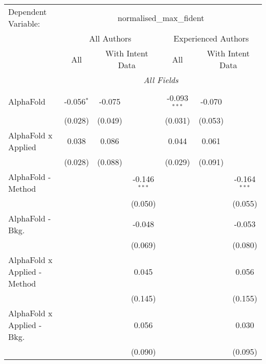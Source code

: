\begingroup
\centering
\begin{tabular}{lcccccc}
   \tabularnewline \midrule \midrule
   Dependent Variable: & \multicolumn{6}{c}{normalised\_max\_fident}\\
 & \multicolumn{3}{c}{All Authors} & \multicolumn{3}{c}{Experienced Authors} \\
\cmidrule(lr){2-4} \cmidrule(lr){5-7}
 & \multicolumn{1}{c}{All} & \multicolumn{2}{c}{With Intent Data} & \multicolumn{1}{c}{All} & \multicolumn{2}{c}{With Intent Data} \\
\cmidrule(lr){2-2} \cmidrule(lr){3-4} \cmidrule(lr){5-5} \cmidrule(lr){6-7}
 & \multicolumn{6}{c}{\textit{All Fields}} \\ \\
   AlphaFold                      & -0.056$^{*}$ & -0.075      &                & -0.093$^{***}$ & -0.070      &   \\   
                                  & (0.028)      & (0.049)     &                & (0.031)        & (0.053)     &   \\   
   AlphaFold x Applied            & 0.038        & 0.086       &                & 0.044          & 0.061       &   \\   
                                  & (0.028)      & (0.088)     &                & (0.029)        & (0.091)     &   \\   
   AlphaFold - Method             &              &             & -0.146$^{***}$ &                &             & -0.164$^{***}$\\   
                                  &              &             & (0.050)        &                &             & (0.055)\\   
   AlphaFold - Bkg.               &              &             & -0.048         &                &             & -0.053\\   
                                  &              &             & (0.069)        &                &             & (0.080)\\   
   AlphaFold x Applied - Method   &              &             & 0.045          &                &             & 0.056\\   
                                  &              &             & (0.145)        &                &             & (0.155)\\   
   AlphaFold x Applied - Bkg.     &              &             & 0.056          &                &             & 0.030\\   
                                  &              &             & (0.090)        &                &             & (0.095)\\   

\end{tabular}
